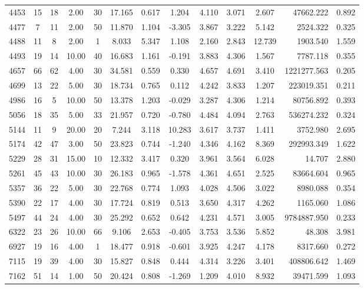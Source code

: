 \documentclass[mnsc]{informs3}
\begin{document}
\begin{APPENDICES}
\begin{longtable}{cccccccccccrc}
4453 & 15 & 18 & 2.00 & 30 & 17.165 & 0.617 & 1.204 & 4.110 & 3.071 & 2.607 & 47662.222 & 0.892 \\
4477 & 7 & 11 & 2.00 & 50 & 11.870 & 1.104 & -3.305 & 3.867 & 3.222 & 5.142 & 2524.322 & 0.325 \\
4488 & 11 & 8 & 2.00 & 1 & 8.033 & 5.347 & 1.108 & 2.160 & 2.843 & 12.739 & 1903.540 & 1.559 \\
4493 & 19 & 14 & 10.00 & 40 & 16.683 & 1.161 & -0.191 & 3.883 & 4.306 & 1.567 & 7787.118 & 0.355 \\
4657 & 66 & 62 & 4.00 & 30 & 34.581 & 0.559 & 0.330 & 4.657 & 4.691 & 3.410 & 1221277.563 & 0.205 \\
4699 & 13 & 22 & 5.00 & 30 & 18.734 & 0.765 & 0.112 & 4.242 & 3.833 & 1.207 & 223019.351 & 0.211 \\
4986 & 16 & 5 & 10.00 & 50 & 13.378 & 1.203 & -0.029 & 3.287 & 4.306 & 1.214 & 80756.892 & 0.393 \\
5056 & 18 & 35 & 5.00 & 33 & 21.957 & 0.720 & -0.780 & 4.484 & 4.094 & 2.763 & 536274.232 & 0.324 \\
5144 & 11 & 9 & 20.00 & 20 & 7.244 & 3.118 & 10.283 & 3.617 & 3.737 & 1.411 & 3752.980 & 2.695 \\
5174 & 42 & 47 & 3.00 & 50 & 23.823 & 0.744 & -1.240 & 4.346 & 4.162 & 8.369 & 292993.349 & 1.622 \\
5229 & 28 & 31 & 15.00 & 10 & 12.332 & 3.417 & 0.320 & 3.961 & 3.564 & 6.028 & 14.707 & 2.880 \\
5261 & 45 & 43 & 10.00 & 30 & 26.183 & 0.965 & -1.578 & 4.361 & 4.651 & 2.525 & 83664.604 & 0.965 \\
5357 & 36 & 22 & 5.00 & 30 & 22.768 & 0.774 & 1.093 & 4.028 & 4.506 & 3.022 & 8980.088 & 0.354 \\
5390 & 22 & 17 & 4.00 & 30 & 17.724 & 0.819 & 0.513 & 3.650 & 4.317 & 4.262 & 1165.060 & 1.086 \\
5497 & 44 & 24 & 4.00 & 30 & 25.292 & 0.652 & 0.642 & 4.231 & 4.571 & 3.005 & 9784887.950 & 0.233 \\
6322 & 23 & 26 & 10.00 & 66 & 9.106 & 2.653 & -0.405 & 3.753 & 3.536 & 5.852 & 48.308 & 3.981 \\
6927 & 19 & 16 & 4.00 & 1 & 18.477 & 0.918 & -0.601 & 3.925 & 4.247 & 4.178 & 8317.660 & 0.272 \\
7115 & 19 & 39 & 4.00 & 30 & 15.827 & 0.848 & 0.444 & 4.314 & 3.226 & 3.401 & 408806.642 & 1.469 \\
7162 & 51 & 14 & 1.00 & 50 & 20.424 & 0.808 & -1.269 & 1.209 & 4.010 & 8.932 & 39471.599 & 1.093 \\

\end{longtable}
\end{APPENDICES}
\end{document}
